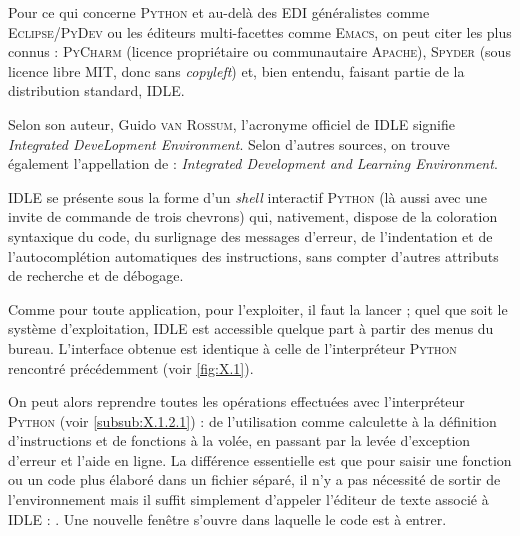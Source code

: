 Pour ce qui concerne \textsc{Python} et au-delà des EDI généralistes comme \textsc{Eclipse/PyDev} ou les éditeurs multi-facettes comme \textsc{Emacs}, on peut citer les plus connus : \textsc{PyCharm} (licence propriétaire ou communautaire \textsc{Apache}), \textsc{Spyder} (sous licence libre MIT, donc sans \textit{copyleft}) et, bien entendu, faisant partie de la distribution standard, IDLE.

Selon son auteur, Guido \textsc{van Rossum}, l'acronyme officiel de IDLE signifie \textit{Integrated DeveLopment Environment}. Selon d'autres sources, on trouve également l'appellation de : \textit{Integrated Development and Learning Environment}.

IDLE se présente sous la forme d'un \textit{shell} interactif \textsc{Python} (là aussi avec une invite de commande de trois chevrons) qui, nativement, dispose de la coloration syntaxique du code, du surlignage des messages d'erreur, de l'indentation et de l'autocomplétion automatiques des instructions, sans compter d'autres attributs de recherche et de débogage.

Comme pour toute application, pour l'exploiter, il faut la lancer ; quel que soit le système d'exploitation, IDLE est accessible quelque part à partir des menus du bureau. L'interface obtenue est identique à celle de l'interpréteur \textsc{Python} rencontré précédemment (voir \cref{fig:X.1}).

On peut alors reprendre toutes les opérations effectuées avec l'interpréteur \textsc{Python} (voir \cref{subsub:X.1.2.1}) : de l'utilisation comme calculette à la définition d'instructions et de fonctions à la volée, en passant par la levée d'exception d'erreur et l'aide en ligne. La différence essentielle est que pour saisir une fonction ou un code plus élaboré dans un fichier séparé, il n'y a pas nécessité de sortir de l'environnement mais il suffit simplement d'appeler l'éditeur de texte associé à IDLE : . Une nouvelle fenêtre s'ouvre dans laquelle le code est à entrer.

